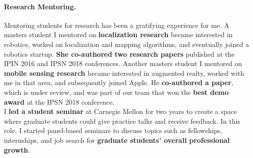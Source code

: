 \documentclass[10pt]{article}
\begin{document}


\paragraph{Research Mentoring. }
Mentoring students for research has been a gratifying experience for me. 
 A masters student I mentored on \textbf{localization research} became interested in robotics, worked on localization and mapping algorithms,  and eventually joined a robotics startup. \textbf{She co-authored two research papers} published at the IPIN 2016 and IPSN 2018 conferences.
Another masters student I mentored on \textbf{mobile sensing research} became interested in augmented realty, worked with me in that area, and subsequently joined Apple. He \textbf{co-authored a paper}, which is under review, and was part of our team that won the \textbf{best demo award} at the IPSN 2018 conference.\\ %

I \textbf{led a student seminar} at Carnegie Mellon for two years to create a space where graduate students could give practice talks and receive feedback. In this role, I started panel-based seminars to discuss topics such as fellowships, internships, and job search for \textbf{graduate students' overall professional growth}. 
\end{document}
